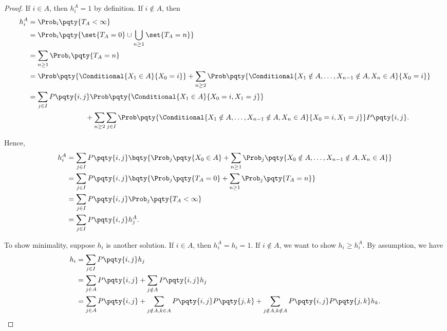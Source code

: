 \begin{proof}
    If \(i \in A\), then \(h_i^A = 1\) by definition. If \(i \notin A\), then
    \begin{align*}
        h_i^A &= \Prob_i \pqty{T_A < \infty} \\
        &= \Prob_i \pqty{\set{T_A = 0} \cup \bigcup_{n \geq 1} \set{T_A = n}} \\
        &= \sum_{n \geq 1} \Prob_i \pqty{T_A = n} \\
        &= \Prob\pqty{\Conditional{X_1 \in A}{X_0 = i}} + \sum_{n \geq 2} \Prob \pqty{\Conditional{X_1 \notin A, \ldots, X_{n-1} \notin A, X_n \in A}{X_0 = i}} \\
        &= \sum_{j \in I} P\pqty{i, j} \Prob\pqty{\Conditional{X_1 \in A}{X_0 = i, X_1 = j}} \\
        &\hspace{8em} + \sum_{n \geq 2} \sum_{j \in I} \Prob\pqty{\Conditional{X_1 \notin A, \ldots, X_{n-1} \notin A, X_n \in A}{X_0 = i, X_1 = j}} P\pqty{i, j}.
    \end{align*}

    Hence,
    \begin{align*}
        h_i^A &= \sum_{j \in I} P\pqty{i, j} \bqty{\Prob_j \pqty{X_0 \in A} + \sum_{n \geq 1} \Prob_j \pqty{X_0 \notin A, \ldots, X_{n-1} \notin A, X_n \in A}} \\
        &= \sum_{j \in I} P\pqty{i, j} \bqty{\Prob_j \pqty{T_A = 0} + \sum_{n \geq 1} \Prob_j\pqty{T_A = n}} \\
        &= \sum_{j \in I} P\pqty{i, j} \Prob_j \pqty{T_A < \infty} \\
        &= \sum_{j \in I} P\pqty{i, j} h_j^A.
    \end{align*}

    To show minimality, suppose \(h_i\) is another solution. If \(i \in A\), then \(h_i^A = h_i = 1\). If \(i \notin A\), we want to show \(h_i \geq h_i^A\). By assumption, we have
    \begin{align*}
        h_i &= \sum_{j \in I} P\pqty{i, j} h_j \\
        &= \sum_{j \in A} P\pqty{i, j} + \sum_{j \notin A} P\pqty{i, j} h_j \\
        &= \sum_{j \in A} P\pqty{i, j} + \sum_{j \notin A, k \in A} P\pqty{i, j} P\pqty{j, k} + \sum_{j \notin A, k \notin A} P\pqty{i, j} P\pqty{j, k} h_k.
    \end{align*}


\end{proof}
